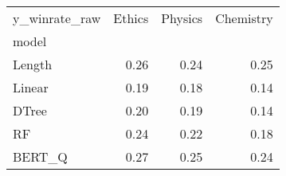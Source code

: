 \begin{tabular}{lrrr}
\toprule
y\_winrate\_raw &  Ethics &  Physics &  Chemistry \\
model  &         &          &            \\
\midrule
Length &    0.26 &     0.24 &       0.25 \\
Linear &    0.19 &     0.18 &       0.14 \\
DTree  &    0.20 &     0.19 &       0.14 \\
RF     &    0.24 &     0.22 &       0.18 \\
BERT\_Q &    0.27 &     0.25 &       0.24 \\
\bottomrule
\end{tabular}

